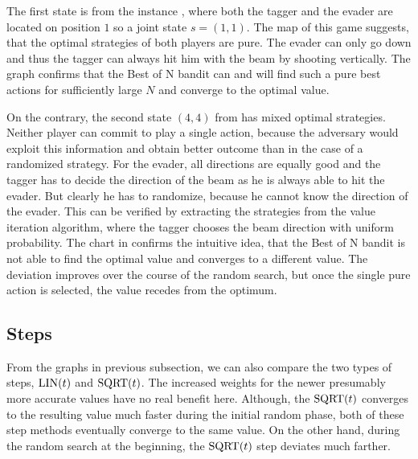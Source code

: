 \documentclass[../main.tex]{subfiles}
\begin{document}
The first state is from the instance , where both the tagger and the evader are located on position $1$ so a joint state $s = \left(1, 1\right)$.
The map of this game  suggests, that the optimal strategies of both players are pure.
The evader can only go down and thus the tagger can always hit him with the beam by shooting vertically.
The graph  confirms that the Best of N bandit can and will find such a pure best actions for sufficiently large $N$ and converge to the optimal value.

On the contrary, the second state $\left(4, 4\right)$ from   has mixed optimal strategies.
Neither player can commit to play a single action, because the adversary would exploit this information and obtain better outcome than in the case of a randomized strategy.
For the evader, all directions are equally good and the tagger has to decide the direction of the beam as he is always able to hit the evader.
But clearly he has to randomize, because he cannot know the direction of the evader.
This can be verified by extracting the strategies from the value iteration algorithm, where the tagger chooses the beam direction with uniform probability.
The chart in  confirms the intuitive idea, that the Best of N bandit is not able to find the optimal value and converges to a different value.
The deviation improves over the course of the random search, but once the single pure action is selected, the value recedes from the optimum.

\subsection{Steps}
From the graphs in previous subsection, we can also compare the two types of steps, $\text{LIN}(t)$ and $\text{SQRT}(t)$.
The increased weights for the newer presumably more accurate values have no real benefit here.
Although, the $\text{SQRT}(t)$ converges to the resulting value much faster during the initial random phase, both of these step methods eventually converge to the same value.
On the other hand, during the random search at the beginning, the $\text{SQRT}(t)$ step deviates much farther.
\end{document}
